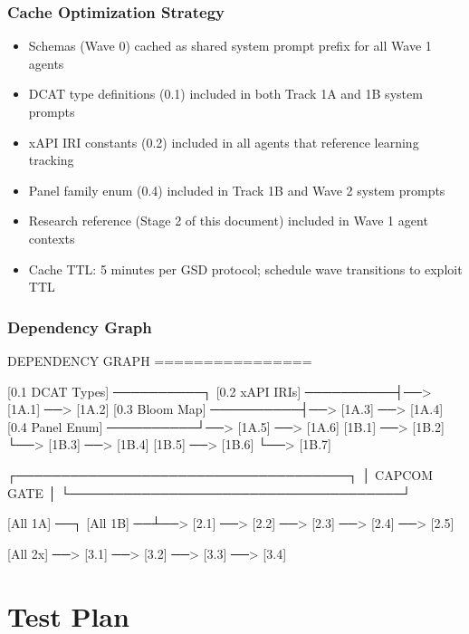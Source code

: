 \documentclass[11pt,letterpaper]{article}
\begin{document}
\subsubsection{Cache Optimization Strategy}

\begin{itemize}[noitemsep]
  \item Schemas (Wave 0) cached as shared system prompt prefix for all Wave 1 agents
  \item DCAT type definitions (0.1) included in both Track 1A and 1B system prompts
  \item xAPI IRI constants (0.2) included in all agents that reference learning tracking
  \item Panel family enum (0.4) included in Track 1B and Wave 2 system prompts
  \item Research reference (Stage 2 of this document) included in Wave 1 agent contexts
  \item Cache TTL: 5 minutes per GSD protocol; schedule wave transitions to exploit TTL
\end{itemize}

\subsubsection{Dependency Graph}

\begin{asciibox}
DEPENDENCY GRAPH
================

[0.1 DCAT Types] ──────────┐
[0.2 xAPI IRIs] ──────────┤──> [1A.1] ──> [1A.2]
[0.3 Bloom Map] ──────────┤──> [1A.3] ──> [1A.4]
[0.4 Panel Enum] ──────────┘──> [1A.5] ──> [1A.6]
                               [1B.1] ──> [1B.2]
                                      └──> [1B.3] ──> [1B.4]
                               [1B.5] ──> [1B.6]
                                      └──> [1B.7]

          ┌─────────────────────────────────────┐
          │         CAPCOM GATE                  │
          └─────────────────────────────────────┘

[All 1A] ──┐
[All 1B] ──┴──> [2.1] ──> [2.2] ──> [2.3] ──> [2.4] ──> [2.5]

[All 2x] ──> [3.1] ──> [3.2] ──> [3.3] ──> [3.4]
\end{asciibox}

\section{Test Plan}
\end{document}
